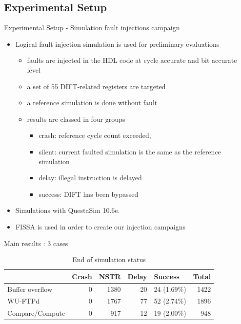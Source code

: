 \subsection{Experimental Setup}
\begin{frame}{Experimental Setup - Simulation fault injections campaign}
    \begin{itemize}
        \justifying
        \item Logical fault injection simulation is used for preliminary evaluations
              \begin{itemize}
                  \justifying
                  \item faults are injected in the HDL code at cycle accurate and bit accurate level
                  \item a set of 55 DIFT-related registers are targeted
                  \item a reference simulation is done without fault
                  \item results are classed in four groups
                        \begin{itemize}
                            \justifying
                            \item crash: reference cycle count exceeded,
                            \item silent: current faulted simulation is the same as the reference simulation
                            \item delay: illegal instruction is delayed
                            \item success: DIFT has been bypassed
                        \end{itemize}
              \end{itemize}
        \item Simulations with QuestaSim 10.6e.
        \item FISSA is used in order to create our injection campaigns
    \end{itemize}
\end{frame}
\begin{frame}{Main results : 3 cases}
    \begin{table}[H]
        \centering
        \caption{End of simulation status}
        \label{table:end_sim_by_status}
        \begin{tabular}{lrrrlr}
            \toprule
                            & Crash & NSTR & Delay & Success     & Total \\
            \midrule
            Buffer overflow & 0     & 1380 & 20    & 24 (1.69\%) & 1422  \\
            WU-FTPd         & 0     & 1767 & 77    & 52 (2.74\%) & 1896  \\
            Compare/Compute & 0     & 917  & 12    & 19 (2.00\%) & 948   \\
            \bottomrule
        \end{tabular}
    \end{table}
\end{frame}

